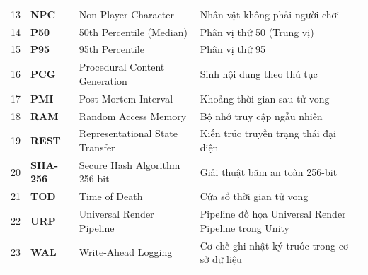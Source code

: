 {\begin{longtable}{c l p{5.5cm} p{5.8cm}}
13 & \textbf{NPC}     & Non-Player Character                          & Nhân vật không phải người chơi \\
14 & \textbf{P50}     & 50th Percentile (Median)                      & Phân vị thứ 50 (Trung vị) \\
15 & \textbf{P95}     & 95th Percentile                               & Phân vị thứ 95 \\
16 & \textbf{PCG}     & Procedural Content Generation                 & Sinh nội dung theo thủ tục \\
17 & \textbf{PMI}     & Post-Mortem Interval                          & Khoảng thời gian sau tử vong \\
18 & \textbf{RAM}     & Random Access Memory                          & Bộ nhớ truy cập ngẫu nhiên \\
19 & \textbf{REST}    & Representational State Transfer               & Kiến trúc truyền trạng thái đại diện \\
20 & \textbf{SHA-256} & Secure Hash Algorithm 256-bit                 & Giải thuật băm an toàn 256-bit \\
21 & \textbf{TOD}     & Time of Death                                 & Cửa sổ thời gian tử vong \\
22 & \textbf{URP}     & Universal Render Pipeline                     & Pipeline đồ họa Universal Render Pipeline trong Unity \\
23 & \textbf{WAL}     & Write-Ahead Logging                           & Cơ chế ghi nhật ký trước trong cơ sở dữ liệu \\
\end{longtable}
}
